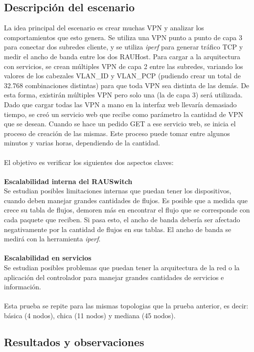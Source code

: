 \subsection{Descripción del escenario}
La idea principal del escenario es crear muchas VPN y analizar los comportamientos que esto genera. Se utiliza una VPN punto a punto de capa 3 para conectar dos subredes cliente, y se utiliza \textit{iperf} para generar tráfico TCP y medir el ancho de banda entre los dos RAUHost. Para cargar a la arquitectura con servicios, se crean múltiples VPN de capa 2 entre las subredes, variando los valores de los cabezales VLAN\_ID y VLAN\_PCP (pudiendo crear un total de 32.768 combinaciones distintas) para que toda VPN sea distinta de las demás. De esta forma, existirán múltiples VPN pero solo una (la de capa 3) será utilizada. \\
Dado que cargar todas las VPN a mano en la interfaz web llevaría demasiado tiempo, se creó un servicio web que recibe como parámetro la cantidad de VPN que se desean. Cuando se hace un pedido GET a ese servicio web, se inicia el proceso de creación de las mismas. Este proceso puede tomar entre algunos minutos y varias horas, dependiendo de la cantidad. \\ \\
El objetivo es verificar los siguientes dos aspectos claves: \\ \\
\textbf{Escalabilidad interna del RAUSwitch} \\
Se estudian posibles limitaciones internas que puedan tener los dispositivos, cuando deben manejar grandes cantidades de flujos. Es posible que a medida que crece su tabla de flujos, demoren más en encontrar el flujo que se corresponde con cada paquete que reciben. Si pasa esto, el ancho de banda debería ser afectado negativamente por la cantidad de flujos en sus tablas. El ancho de banda se medirá con la herramienta \textit{iperf}.  \\ \\
\textbf{Escalabilidad en servicios} \\
Se estudian posibles problemas que puedan tener la arquitectura de la red o la aplicación del controlador para manejar grandes cantidades de servicios e información. \\ \\
Esta prueba se repite para las mismas topologias que la prueba anterior, es decir: básica (4 nodos), chica (11 nodos) y mediana (45 nodos).

\subsection{Resultados y observaciones}

